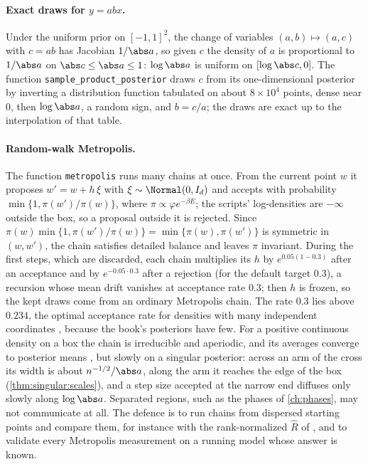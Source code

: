 \begin{refsection}
\paragraph{Exact draws for $y=abx$.} Under the uniform prior on $[-1,1]^2$, the change of variables $(a,b)\mapsto(a,c)$ with $c=ab$ has Jacobian $1/\abs a$, so given $c$ the density of $a$ is proportional to $1/\abs a$ on $\abs c\le\abs a\le1$: $\log\abs a$ is uniform on $[\log\abs c,0]$. The function \texttt{sample\_\allowbreak product\_\allowbreak posterior} draws $c$ from its one-dimensional posterior by inverting a distribution function tabulated on about $8\times10^4$ points, dense near $0$, then $\log\abs a$, a random sign, and $b=c/a$; the draws are exact up to the interpolation of that table.

\paragraph{Random-walk Metropolis.} The function \texttt{metropolis} runs many chains at once. From the current point $w$ it proposes $w'=w+h\,\xi$ with $\xi\sim\Normal(0,I_d)$ and accepts with probability $\min\{1,\pi(w')/\pi(w)\}$, where $\pi\propto\varphi e^{-\beta E}$; the scripts' log-densities are $-\infty$ outside the box, so a proposal outside it is rejected. Since $\pi(w)\min\{1,\pi(w')/\pi(w)\}=\min\{\pi(w),\pi(w')\}$ is symmetric in $(w,w')$, the chain satisfies detailed balance and leaves $\pi$ invariant. During the first steps, which are discarded, each chain multiplies its $h$ by $e^{0.05(1-0.3)}$ after an acceptance and by $e^{-0.05\cdot0.3}$ after a rejection (for the default target $0.3$), a recursion whose mean drift vanishes at acceptance rate $0.3$; then $h$ is frozen, so the kept draws come from an ordinary Metropolis chain. The rate $0.3$ lies above $0.234$, the optimal acceptance rate for densities with many independent coordinates \parencite{RobertsEtAl1997}, because the book's posteriors have few. For a positive continuous density on a box the chain is irreducible and aperiodic, and its averages converge to posterior means \parencite{Tierney1994}, but slowly on a singular posterior: across an arm of the cross its width is about $n^{-1/2}/\abs a$, along the arm it reaches the edge of the box (\cref{thm:singular:scales}), and a step size accepted at the narrow end diffuses only slowly along $\log\abs a$. Separated regions, such as the phases of \cref{ch:phases}, may not communicate at all. The defence is to run chains from dispersed starting points and compare them, for instance with the rank-normalized $\hat R$ of \textcite{VehtariEtAl2021}, and to validate every Metropolis measurement on a running model whose answer is known.


\end{refsection}
